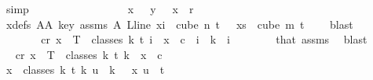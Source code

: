 \begin{isabellebody}
\ simp\ \ \ \ \ \ \isanewline
\ \ \ \ \ \ \isamarkupfalse%
\ \isamarkupfalse%
\ {\isachardoublequoteopen}\ {\isasymchi}\ x\ {\isacharequal}{\kern0pt}\ {\isasymchi}\ y\ {\isasymand}\ {\isasymchi}\ x\ {\isacharless}{\kern0pt}\ r{\isachardoublequoteclose}\ \isamarkupfalse%
\ xdefs\ AA{}\ key\ assms{\isacharparenleft}{\kern0pt}{}{\isacharparenright}{\kern0pt}\ A\ {\isacartoucheopen}L{\isacharunderscore}{\kern0pt}line\ xi\ {\isasymin}\ cube\ n\ {\isacharparenleft}{\kern0pt}t\ {\isacharplus}{\kern0pt}\ {}{\isacharparenright}{\kern0pt}{\isacartoucheclose}\ {\isacartoucheopen}xs\ {\isasymin}\ cube\ m\ {\isacharparenleft}{\kern0pt}t\ {\isacharplus}{\kern0pt}\ {}{\isacharparenright}{\kern0pt}{\isacartoucheclose}\ \isamarkupfalse%
\ blast\isanewline
\ \ \ \ \isamarkupfalse%
\isanewline
\ \ \ \ \isamarkupfalse%
\ \isamarkupfalse%
\ {\isachardoublequoteopen}{\isasymexists}c{\isacharless}{\kern0pt}r{\isachardot}{\kern0pt}\ {\isasymforall}x\ {\isasymin}\ T\ {\isacharbackquote}{\kern0pt}\ classes\ {\isacharparenleft}{\kern0pt}k{\isacharplus}{\kern0pt}{}{\isacharparenright}{\kern0pt}\ t\ i{\isachardot}{\kern0pt}\ {\isasymchi}\ x\ {\isacharequal}{\kern0pt}\ c{\isachardoublequoteclose}\ \ {\isachardoublequoteopen}i\ {\isasymle}\ k{\isachardoublequoteclose}\ \ i\isanewline
\ \ \ \ \ \ \isamarkupfalse%
\ that\ assms{\isacharparenleft}{\kern0pt}{}{\isacharparenright}{\kern0pt}\ \isamarkupfalse%
\ blast\isanewline
\isanewline
\ \ \ \ \isamarkupfalse%
\ \isamarkupfalse%
\ {\isachardoublequoteopen}{\isasymexists}c{\isacharless}{\kern0pt}r{\isachardot}{\kern0pt}\ {\isasymforall}x\ {\isasymin}\ T\ {\isacharbackquote}{\kern0pt}\ classes\ {\isacharparenleft}{\kern0pt}k{\isacharplus}{\kern0pt}{}{\isacharparenright}{\kern0pt}\ t\ {\isacharparenleft}{\kern0pt}k{\isacharplus}{\kern0pt}{}{\isacharparenright}{\kern0pt}{\isachardot}{\kern0pt}\ {\isasymchi}\ x\ {\isacharequal}{\kern0pt}\ c{\isachardoublequoteclose}\isanewline
\ \ \ \ \isamarkupfalse%
\ {\isacharminus}{\kern0pt}\isanewline
\ \ \ \ \ \ \isamarkupfalse%
\ {\isachardoublequoteopen}{\isasymforall}x\ {\isasymin}\ classes\ {\isacharparenleft}{\kern0pt}k{\isacharplus}{\kern0pt}{}{\isacharparenright}{\kern0pt}\ t\ {\isacharparenleft}{\kern0pt}k{\isacharplus}{\kern0pt}{}{\isacharparenright}{\kern0pt}{\isachardot}{\kern0pt}\ {\isasymforall}u\ {\isacharless}{\kern0pt}\ k\ {\isacharplus}{\kern0pt}\ {}{\isachardot}{\kern0pt}\ x\ u\ {\isacharequal}{\kern0pt}\ t{\isachardoublequoteclose}\ \isamarkupfalse%

\end{isabellebody}
